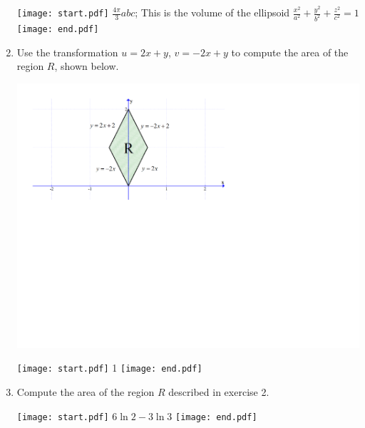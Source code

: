 \documentclass[12pt]{article}
\begin{document}
\begin{enumerate}
\texttt{[image: start.pdf]}
{{$\frac{4\pi}{3}abc$; This is the volume of the ellipsoid  $\frac{x^2}{a^2}+\frac{y^2}{b^2}+\frac{z^2}{c^2} = 1$}}
\texttt{[image: end.pdf]}


\item Use the transformation $u=2x+y$, $v=-2x+y$ to compute the area of the region $R$, shown below.

\begin{center}
\includegraphics[scale=0.6]{region4.pdf}
\end{center}

\texttt{[image: start.pdf]}
{{1}}
\texttt{[image: end.pdf]}


\item Compute the area of the region $R$ described in exercise 2.

\texttt{[image: start.pdf]}
{{$6\ln{2}-3\ln{3}$}}
\texttt{[image: end.pdf]}


\end{enumerate}
\end{document}
